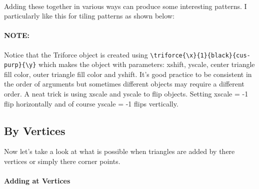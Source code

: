 \documentclass[11pt]{article}
\begin{document}
\\
Adding these together in various ways can produce some interesting patterns. I particularly like this
for tiling patterns as shown below:\\
\bigskip
{}
\paragraph{NOTE:}
Notice that the Triforce object is created using \verb|\triforce{\x}{1}{black}{cus-purp}{\y}|
which makes the object with parameters: xshift, yscale, center triangle fill color, outer 
triangle fill color and yshift. It's good practice to be consistent in the order of arguments
but sometimes different objects may require a different order. A neat trick is using xscale and 
yscale to flip objects. Setting xscale = -1 flip horizontally and of course yscale = -1 flips 
vertically.

\subsection{By Vertices}
Now let's take a look at what is possible when triangles are added by there vertices or simply there
corner points. 
\paragraph{Adding at Vertices}
\end{document}
